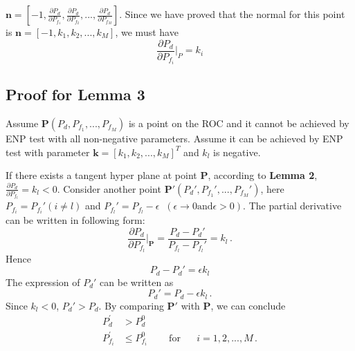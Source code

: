 \documentclass[12pt,journal,a4paper,twoside,onecolumn,draft]{IEEEtran}
\begin{document}
\begin{spacing}{2.5}
 $\mathbf{n} = [-1, \frac{\partial P_d}{\partial P_{f_1}}, \frac{\partial P_d}{\partial P_{f_2}}, ..., \frac{\partial P_d}{\partial P_{f_M}}]$. Since we have proved that  the normal for this point is $\mathbf{n} = [-1, k_1, k_2, ..., k_M]$, we must have
\begin{equation}
\frac{\partial P_d}{\partial P_{f_i}}\bigg|_{P} = k_i
\end{equation}


\subsection{Proof for Lemma 3}
Assume $\mathbf{P} (P_d, P_{f_1}, ..., P_{f_M})$ is a point on the ROC and it cannot be achieved by ENP test with all non-negative parameters. Assume it can be achieved by ENP test with parameter $\mathbf{k} = [k_1, k_2, ..., k_M]^T$ and $k_l$ is negative.

 If there exists a tangent hyper plane at point $\mathbf{P}$, according to \textbf{Lemma 2}, $\frac{\partial P_d}{\partial P_{f_l}} = k_l < 0$. Consider another point $\mathbf{P}' (P_d', P_{f_1}', ..., P_{f_M}')$, here $P_{f_i} = P_{f_i}' (i \neq l)$ and $P_{f_l}' = P_{f_l} - \epsilon \;\;(\epsilon \rightarrow 0 \text{and} \epsilon >0)$. The partial derivative can be written in following form:
 \begin{equation}
   \frac{\partial P_d}{ \partial P_{f_l}} \bigg|_{\mathbf{P}} = \frac{P_d - P_d'}{P_{f_l} - P_{f_l}'} = k_l\,.
 \end{equation}
 Hence
 \begin{equation}
   P_d - P_d' = \epsilon k_l
 \end{equation}
 The expression of $P_d'$ can be written as
 \begin{equation}
   P_d'= P_d - \epsilon k_l\,.
 \end{equation}
Since $k_l < 0$, $P_d' > P_d$. By comparing $\mathbf{P}'$ with $\mathbf{P}$, we can conclude
\begin{equation}
\begin{split}
  P_{d}^\prime &> P_{d}^0\\
  P_{f_i}^\prime &\leq P_{f_i}^0 \;\;\;\;\;\;\;\;\text{for}\;\;\;\;\;\; i=1, 2, ..., M\,.
\end{split}
\end{equation}


\end{spacing}
\end{document}
